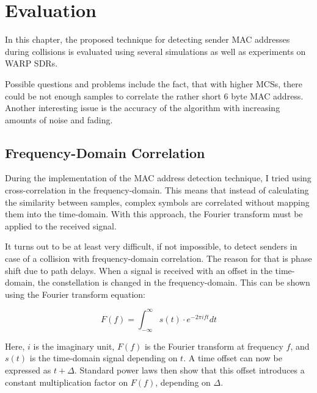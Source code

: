 
\chapter{Evaluation}\label{ch:evaluation}
\glsresetall %

In this chapter, the proposed technique for detecting sender \gls{MAC} addresses during collisions is evaluated using several simulations as well as experiments on \gls{WARP} \glspl{SDR}.

Possible questions and problems include the fact, that with higher \glspl{MCS}, there could be not enough samples to correlate the rather short 6 byte \gls{MAC} address. Another interesting issue is the accuracy of the algorithm with increasing amounts of noise and fading.



\section{Frequency-Domain Correlation}\label{sec:freqd-correlation}

During the implementation of the \gls{MAC} address detection technique, I tried using cross-correlation in the frequency-domain. This means that instead of calculating the similarity between samples, complex symbols are correlated without mapping them into the time-domain. With this approach, the Fourier transform must be applied to the received signal.

It turns out to be at least very difficult, if not impossible, to detect senders in case of a collision with frequency-domain correlation. The reason for that is phase shift due to path delays. When a signal is received with an offset in the time-domain, the constellation is changed in the frequency-domain. This can be shown using the Fourier transform equation:

$$ F(f) = \int_{-\infty}^{\infty} s(t) \cdot e^{-2 \pi i f t} dt $$\vspace{0cm}

Here, $ i $ is the imaginary unit, $ F(f) $ is the Fourier transform at frequency $ f $, and $ s(t) $ is the time-domain signal depending on $ t $. A time offset can now be expressed as $ t + \Delta $. Standard power laws then show that this offset introduces a constant multiplication factor on $ F(f) $, depending on $ \Delta $.

